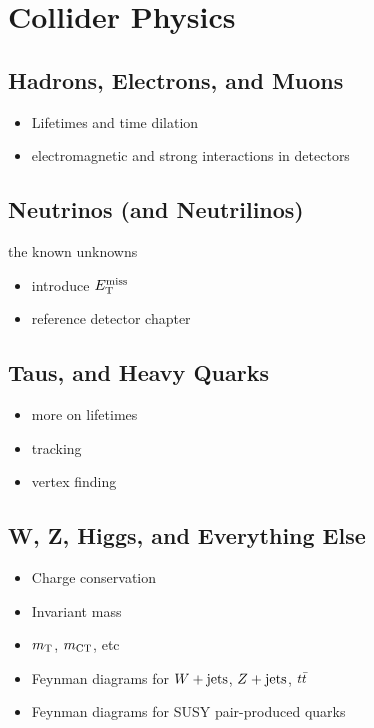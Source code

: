 \section{Collider Physics}
\label{sec:pheno}
\subsection{Hadrons, Electrons, and Muons}
\begin{itemize}
\item Lifetimes and time dilation
\item electromagnetic and strong interactions in detectors
\end{itemize}
\subsection{Neutrinos (and Neutrilinos)}
the known unknowns
\begin{itemize}
\item introduce $E_{\rm T}^{\rm miss}$
\item reference detector chapter
\end{itemize}
\subsection{Taus, and Heavy Quarks}
\begin{itemize}
\item more on lifetimes
\item tracking
\item vertex finding
\end{itemize}
\subsection{W, Z, Higgs, and Everything Else}
\begin{itemize}
\item Charge conservation
\item Invariant mass
\item $m_{\rm T}$, $m_{\rm CT}$, etc
\item Feynman diagrams for $W + \text{jets}$, $Z + \text{jets}$, $t \bar{t}$
\item Feynman diagrams for SUSY pair-produced quarks
\end{itemize}
